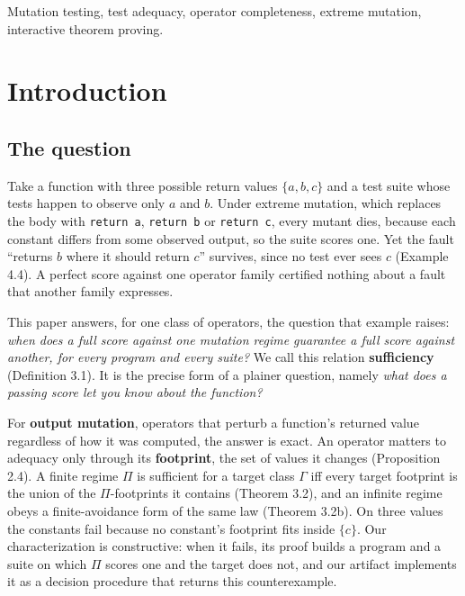 \documentclass[conference]{IEEEtran}
\theoremstyle{run}
\begin{document}
\begin{abstract}
on paper. Our artifact includes a decision procedure for finite sufficiency that returns the theorem's counterexample.
\end{abstract}
\begin{IEEEkeywords}
Mutation testing, test adequacy, operator completeness, extreme mutation, interactive theorem proving.
\end{IEEEkeywords}

\setcounter{section}{0}
\section{Introduction}
\setcounter{subsection}{0}
\subsection{The question}
Take a function with three possible return values $\{a, b, c\}$ and a test suite whose tests happen to observe only $a$ and $b$. Under extreme mutation, which replaces the body with \texttt{return a}, \texttt{return b} or \texttt{return c}, every mutant dies, because each constant differs from some observed output, so the suite scores one. Yet the fault ``returns $b$ where it should return $c$'' survives, since no test ever sees $c$ (Example 4.4). A perfect score against one operator family certified nothing about a fault that another family expresses.

This paper answers, for one class of operators, the question that example raises: \emph{when does a full score against one mutation regime guarantee a full score against another, for every program and every suite?} We call this relation \textbf{sufficiency} (Definition 3.1). It is the precise form of a plainer question, namely \emph{what does a passing score let you know about the function?}

For \textbf{output mutation}, operators that perturb a function's returned value regardless of how it was computed, the answer is exact. An operator matters to adequacy only through its \textbf{footprint}, the set of values it changes (Proposition 2.4). A finite regime $\Pi$ is sufficient for a target class $\Gamma$ iff every target footprint is the union of the $\Pi$-footprints it contains (Theorem 3.2), and an infinite regime obeys a finite-avoidance form of the same law (Theorem 3.2b). On three values the constants fail because no constant's footprint fits inside $\{c\}$. Our characterization is constructive: when it fails, its proof builds a program and a suite on which $\Pi$ scores one and the target does not, and our artifact implements it as a decision procedure that returns this counterexample.
\end{document}
